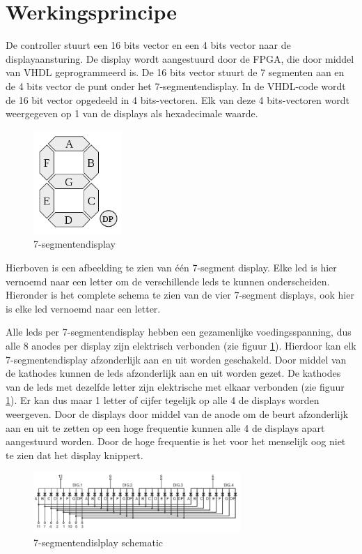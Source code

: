 \documentclass{report}
\begin{document}
\newpage
\section{Werkingsprincipe}
De controller stuurt een 16 bits vector en een 4 bits vector naar de displayaansturing.
De display wordt aangestuurd door de FPGA, die door middel van VHDL geprogrammeerd is.
De 16 bits vector stuurt de 7 segmenten aan en de 4 bits vector de punt onder het 7-segmentendisplay.
In de VHDL-code wordt de 16 bit vector opgedeeld in 4 bits-vectoren.
Elk van deze 4 bits-vectoren wordt weergegeven op 1 van de displays als hexadecimale waarde.
\begin{figure}[H]
\centering
\includegraphics[width=0.3\textwidth]{7_segment_display.png}

\caption{7-segmentendisplay}
\end{figure}
Hierboven is een afbeelding te zien van \'{e}\'{e}n 7-segment display.
Elke led is hier vernoemd naar een letter om de verschillende leds te kunnen onderscheiden.
Hieronder is het complete schema te zien van de vier 7-segment displays, ook hier is elke led vernoemd naar een letter.

Alle leds per 7-segmentendisplay hebben een gezamenlijke voedingsspanning, dus alle 8 anodes per display zijn elektrisch verbonden (zie figuur \ref{fig:ssegschematic}).
Hierdoor kan elk 7-segmentendisplay afzonderlijk aan en uit worden geschakeld.
Door middel van de kathodes kunnen de leds afzonderlijk aan en uit worden gezet.
De kathodes van de leds met dezelfde letter zijn elektrische met elkaar verbonden (zie figuur \ref{fig:ssegschematic}).
Er kan dus maar 1 letter of cijfer tegelijk op alle 4 de displays worden weergeven.
Door de displays door middel van de anode om de beurt afzonderlijk aan en uit te zetten op een hoge frequentie kunnen alle 4 de displays apart aangestuurd worden.
Door de hoge frequentie is het voor het menselijk oog niet te zien dat het display knippert.
\begin{figure}[H]
\centering

\includegraphics[width=0.7\textwidth]{7_segment_display_schematic.png}

\caption{7-segmentendislplay schematic}
\label{fig:ssegschematic}
\end{figure}
\end{document}
